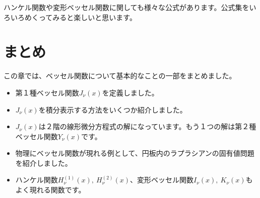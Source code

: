 \documentclass[report,paper=a4, fontsize=12pt, line_length=16cm, number_of_lines=33,dvipdfmx]{jlreq}
\numberwithin{equation}{section}
\begin{document}
ハンケル関数や変形ベッセル関数に関しても様々な公式があります。公式集をいろいろめくってみると楽しいと思います。

\section{まとめ}
この章では、ベッセル関数について基本的なことの一部をまとめました。
\begin{itemize}
  \item 第１種ベッセル関数$J_{\nu}(x)$を定義しました。
  \item $J_{\nu}(x)$を積分表示する方法をいくつか紹介しました。
  \item $J_{\nu}(x)$は２階の線形微分方程式の解になっています。もう１つの解は第２種ベッセル関数$Y_{\nu}(x)$です。
  \item 物理にベッセル関数が現れる例として、円板内のラプラシアンの固有値問題を紹介しました。
  \item ハンケル関数$H^{(1)}_{\nu}(x),\ H^{(2)}_{\nu}(x)$、変形ベッセル関数$I_{\nu}(x),\ K_{\nu}(x)$もよく現れる関数です。
\end{itemize}
\end{document}
